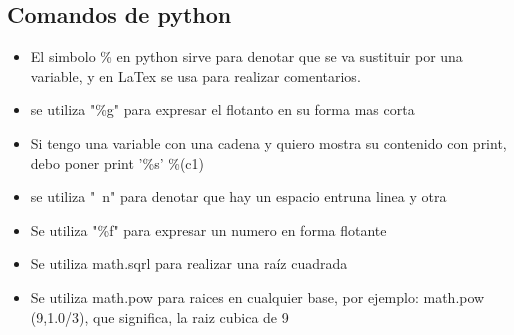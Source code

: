 \documentclass{book}
\begin{document}
	\subsection {Comandos de python}%
	\begin{itemize}%
		\item El simbolo \% en python sirve para denotar que se va sustituir por una variable, y en LaTex se usa para realizar comentarios.
		\item se utiliza "\%g" para expresar el flotanto en su forma mas corta
		\item Si tengo una variable con una cadena y quiero mostra su contenido con print, debo poner print '\%s' \%(c1)
		\item se utiliza "\ n" para denotar que hay un espacio entruna linea y otra
		\item Se utiliza "\%f" para expresar un numero en forma flotante
		\item Se utiliza math.sqrl para realizar una raíz cuadrada
		\item Se utiliza math.pow para raices en cualquier base, por ejemplo: math.pow (9,1.0/3), que significa, la raiz cubica de 9
		
		
	\end{itemize}%
\end{document}
